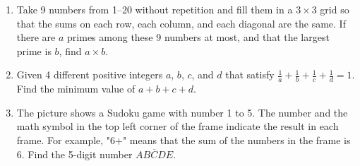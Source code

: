 \documentclass[12pt]{scrartcl}
\begin{document}
\begin{enumerate}
\item Take 9 numbers from 1--20 without repetition and fill them in a $3 \times 3$ grid so that the sums on each row, each column, and each diagonal are the same. If there are $a$ primes among these 9 numbers at most, and that the largest prime is $b$, find $a \times b$.

\item Given 4 different positive integers $a$, $b$, $c$, and $d$ that satisfy $\frac{1}{a} + \frac{1}{b} + \frac{1}{c} + \frac{1}{d} = 1$. Find the minimum value of $a+b+c+d$.

\item The picture shows a Sudoku game with number 1 to 5. The number and the math symbol in the top left corner of the frame indicate the result in each frame. For example, "6+" means that the sum of the numbers in the frame is 6. Find the 5-digit number $\overline{ABCDE}$.

\end{enumerate}
\end{document}
